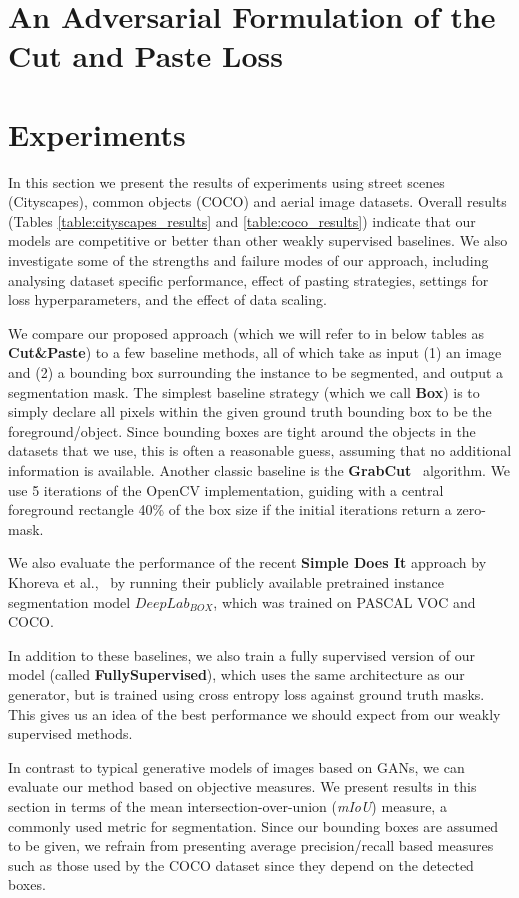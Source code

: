 \documentclass[runningheads]{llncs}
\begin{document}
\section{An Adversarial Formulation of the Cut and Paste Loss}


\section{Experiments}
In this section we present the results of experiments using street scenes (Cityscapes), common objects (COCO) and aerial image datasets. Overall results (Tables \ref{table:cityscapes_results} and \ref{table:coco_results}) indicate that 
our models are competitive
or better than other weakly supervised baselines.
We also investigate some of the strengths and failure modes of our approach, including analysing dataset specific performance, effect of pasting strategies, settings for loss hyperparameters, and the effect of data scaling.

We compare our proposed approach (which we will refer to in below tables as
{\bf Cut\&Paste}) to a few baseline methods, all of which take as input (1) an image and (2) a bounding box surrounding the
instance to be segmented, and output a segmentation mask.
The simplest baseline strategy (which we call {\bf Box}) is to simply declare 
all pixels within the given ground truth bounding box to be the foreground/object. Since bounding boxes are tight around the objects in the datasets that we use, this is often a reasonable guess, assuming that no additional information is available.
Another classic baseline is the {\bf GrabCut}~\cite{rother2004grabcut} algorithm. We use 5 iterations of the OpenCV implementation, guiding with a central foreground rectangle 40\% of the box size if the initial iterations return a zero-mask.

We also evaluate the performance of the recent {\bf Simple Does It} approach
by Khoreva et al.,~\cite{khoreva2016simple} by running their publicly available pretrained instance segmentation model $DeepLab_{BOX}$, which was trained on PASCAL VOC \cite{pascal-voc-2012} and COCO.

In addition to these baselines, we also train a fully supervised version of our model (called {\bf FullySupervised}), which uses the same architecture as our generator, but is trained using cross entropy loss against ground truth masks. This gives us an idea of the best performance we should expect from our weakly supervised methods.


In contrast to typical generative models of images based on GANs, we can evaluate our method based on objective measures. We present results in this section in terms of the mean intersection-over-union (\emph{mIoU}) measure,
a commonly used metric for segmentation. Since our bounding boxes are assumed to be given, 
we refrain from presenting average precision/recall based measures such as those used by the COCO dataset since they depend on the detected boxes. 
\end{document}
